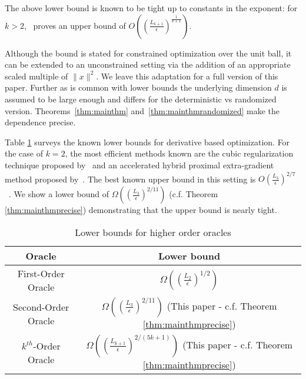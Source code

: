 \documentclass[final,12pt]{colt2018} %
\begin{document}
The above lower bound is known to be tight up to constants in the exponent:  for $k > 2$,~\cite{baeshigherorder} proves an upper bound of $O\left( \left(\frac{L_{k+1}}{\epsilon} \right)^{\frac{1}{k+1}}\right)$. %


Although the bound is stated for constrained optimization over the unit ball, it can be extended to an unconstrained setting via the addition of an appropriate scaled multiple of $\|x\|^2$. We leave this adaptation for a full version of this paper. Further as is common with lower bounds the underlying dimension $d$ is assumed to be large enough and differs for the deterministic vs randomized version. Theorems~\ref{thm:mainthm} and~\ref{thm:mainthmrandomized} make the dependence precise.

Table \ref{table:main2} surveys the known lower bounds for derivative based optimization. For the case of $k=2$, the most efficient methods known are the cubic regularization technique proposed by~\cite{nesterov2008cubic} and an accelerated hybrid proximal extra-gradient method proposed by~\cite{monteiro2013accelerated}. The best known upper bound in this setting is $O\left(\frac{L_3}{\epsilon}\right)^{2/7}$~\citep{monteiro2013accelerated}. We show a lower bound of $\Omega\left(\left( \frac{L_3}{\epsilon}\right)^{2/11}\right)$ (c.f. Theorem \ref{thm:mainthmprecise}) demonstrating that the upper bound is nearly tight.
\begin{table}
  \begin{center}
  \begin{tabular}{ |c|c|}
  \hline
  Oracle & Lower bound \\
  \hline
  First-Order Oracle & $\Omega\left( \left(\frac{L_2}{\epsilon}\right)^{1/2} \right)$  \citep{Nemirovsky1978}\\
  \hline
  Second-Order Oracle & $\Omega\left( \left(\frac{L_3}{\epsilon}\right)^{2/11} \right)$ (This paper  - c.f. Theorem \ref{thm:mainthmprecise}) \\
  \hline
  $k^{th}$-Order Oracle & $\Omega\left( \left(\frac{L_{k+1}}{\epsilon}\right)^{2/(5k + 1)} \right)$ (This paper - c.f. Theorem \ref{thm:mainthmprecise}) \\
  \hline
  \end{tabular}
  \caption{Lower bounds for higher order oracles}
  \label{table:main2}
  \end{center}

\end{table}
\end{document}
